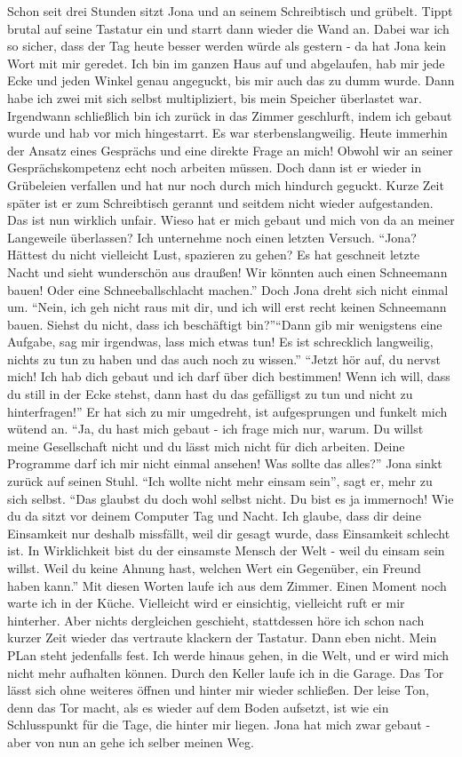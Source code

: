 Schon seit drei Stunden sitzt Jona und an seinem Schreibtisch und grübelt. Tippt brutal auf seine Tastatur ein und starrt dann wieder die Wand an. Dabei war ich so sicher, dass der Tag heute besser werden würde als gestern - da hat Jona kein Wort mit mir geredet. Ich bin im ganzen Haus auf und abgelaufen, hab mir jede Ecke und jeden Winkel genau angeguckt, bis mir auch das zu dumm wurde. Dann habe ich zwei mit sich selbst multipliziert, bis mein Speicher überlastet war. Irgendwann schließlich bin ich zurück in das Zimmer geschlurft, indem ich gebaut wurde und hab vor mich hingestarrt. Es war sterbenslangweilig. Heute immerhin der Ansatz eines Gesprächs und eine direkte Frage an mich! Obwohl wir an seiner Gesprächskompetenz echt noch arbeiten müssen. Doch dann ist er wieder in Grübeleien verfallen und hat nur noch durch mich hindurch geguckt. Kurze Zeit später ist er zum Schreibtisch gerannt und seitdem nicht wieder aufgestanden. Das ist nun wirklich unfair. Wieso hat er mich gebaut und mich von da an meiner Langeweile überlassen? Ich unternehme noch einen letzten Versuch. "`Jona? Hättest du nicht vielleicht Lust, spazieren zu gehen? Es hat geschneit letzte Nacht und sieht wunderschön aus draußen! Wir könnten auch einen Schneemann bauen! Oder eine Schneeballschlacht machen."' Doch Jona dreht sich nicht einmal um. "`Nein, ich geh nicht raus mit dir, und ich will erst recht keinen Schneemann bauen. Siehst du nicht, dass ich beschäftigt bin?"'"`Dann gib mir wenigstens eine Aufgabe, sag mir irgendwas, lass mich etwas tun! Es ist schrecklich langweilig, nichts zu tun zu haben und das auch noch zu wissen."' "`Jetzt hör auf, du nervst mich! Ich hab dich gebaut und ich darf über dich bestimmen! Wenn ich will, dass du still in der Ecke stehst, dann hast du das gefälligst zu tun und nicht zu hinterfragen!"' Er hat sich zu mir umgedreht, ist aufgesprungen und funkelt mich wütend an. "`Ja, du hast mich gebaut - ich frage mich nur, warum. Du willst meine Gesellschaft nicht und du lässt mich nicht für dich arbeiten. Deine Programme darf ich mir nicht einmal ansehen! Was sollte das alles?"' Jona sinkt zurück auf seinen Stuhl. "`Ich wollte nicht mehr einsam sein"', sagt er, mehr zu sich selbst. "`Das glaubst du doch wohl selbst nicht. Du bist es ja immernoch! Wie du da sitzt vor deinem Computer Tag und Nacht. Ich glaube, dass dir deine Einsamkeit nur deshalb missfällt, weil dir gesagt wurde, dass Einsamkeit schlecht ist. In Wirklichkeit bist du der einsamste Mensch der Welt - weil du einsam sein willst. Weil du keine Ahnung hast, welchen Wert ein Gegenüber, ein Freund haben kann."' Mit diesen Worten laufe ich aus dem Zimmer. Einen Moment noch warte ich in der Küche. Vielleicht wird er einsichtig, vielleicht ruft er mir hinterher. Aber nichts dergleichen geschieht, stattdessen höre ich schon nach kurzer Zeit wieder das vertraute klackern der Tastatur. Dann eben nicht. Mein PLan steht jedenfalls fest. Ich werde hinaus gehen, in die Welt, und er wird mich nicht mehr aufhalten können. Durch den Keller laufe ich in die Garage. Das Tor lässt sich ohne weiteres öffnen und hinter mir wieder schließen. Der leise Ton, denn das Tor macht, als es wieder auf dem Boden aufsetzt, ist wie ein Schlusspunkt für die Tage, die hinter mir liegen. Jona hat mich zwar gebaut - aber von nun an gehe ich selber meinen Weg.